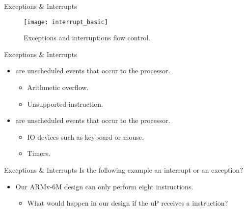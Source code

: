 % 
\begin{frame}{Exceptions \& Interrupts}{}
\begin{figure}
\centering
\texttt{[image: interrupt\_basic]}
\caption{Exceptions and interruptions flow control.}
\label{Figure:Interruption_basic}
\end{figure}
\end{frame}

% 
\begin{frame}{Exceptions \& Interrupts}{}
\begin{itemize}
\item {} are  unscheduled events that occur  to the processor.
\pauseprint
  \begin{itemize}
  \item Arithmetic overflow.
  \item Unsupported instruction.
  \end{itemize}
\pauseprint
\item {} are  unscheduled events that occur  to the processor.
\pauseprint
  \begin{itemize}
  \item \ac{IO} devices such as keyboard or mouse.
  \item Timers.
  \end{itemize}
\end{itemize}
\end{frame} 

% 
\begin{frame}{Exceptions \& Interrupts}{}
Is the following example an interrupt or an exception?
\begin{itemize}
\item Our ARMv-6M design can only perform eight instructions.
  \begin{itemize}
  \item What would happen in our design if the \ac{uP} receives a  instruction?
  \end{itemize}
\end{itemize}
\end{frame} 

